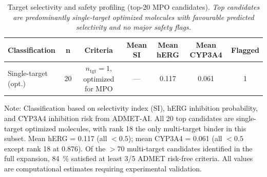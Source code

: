 \documentclass[journal=jcisd8,manuscript=suppinfo]{achemso}
\begin{document}
\begin{table}[htbp]
\centering
\caption{Target selectivity and safety profiling (top-20 MPO candidates). \textit{Top candidates are predominantly single-target optimized molecules with favourable predicted selectivity and no major safety flags.}}
\label{tab:sm_s21_polypharm}
\begin{tabular}{lcccccc}
\toprule
\textbf{Classification} & \textbf{n} & \textbf{Criteria} & \textbf{Mean SI} & \textbf{Mean hERG} & \textbf{Mean CYP3A4} & \textbf{Flagged} \\
\midrule
Single-target (opt.) & \num{20} & $n_{\text{tgt}} = \num{1}$, optimized for MPO & --- & \num{0.117} & \num{0.061} & \num{1} \\
\bottomrule
\end{tabular}
\vspace{0.5em}
\begin{footnotesize}
Note: Classification based on selectivity index (SI), hERG inhibition probability,
and CYP3A4 inhibition risk from ADMET-AI. All \num{20} top candidates are single-target
optimized molecules, with rank \num{18} the only multi-target binder in this subset. Mean hERG = \num{0.117} (all $<\num{0.5}$); mean CYP3A4 = \num{0.061} (all $<\num{0.5}$
except rank \num{18} at \num{0.876}). Of the $>\num{70}$ multi-target candidates identified in the full
expansion, \qty{84}{\percent} satisfied at least \num{3}/\num{5} ADMET risk-free criteria.
All values are computational estimates requiring experimental validation.
\end{footnotesize}
\end{table}
\end{document}
